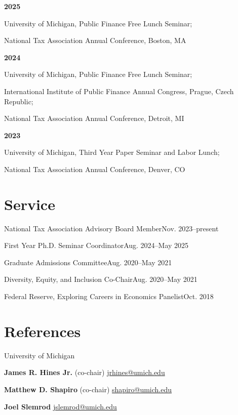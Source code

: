 \documentclass[11pt,letterpaper]{article}
\newcommand{\gap}{\vspace{6pt}}
\begin{document}
\textbf{2025}\par
University of Michigan, Public Finance Free Lunch Seminar;\par
National Tax Association Annual Conference, Boston, MA
\gap

\textbf{2024}\par
University of Michigan, Public Finance Free Lunch Seminar;\par
International Institute of Public Finance Annual Congress, Prague, Czech Republic;\par
National Tax Association Annual Conference, Detroit, MI
\gap

\textbf{2023}\par
University of Michigan, Third Year Paper Seminar and Labor Lunch;\par
National Tax Association Annual Conference, Denver, CO

\section{Service}
National Tax Association Advisory Board Member\hfill Nov. 2023--present\par\vspace{6pt}
First Year Ph.D. Seminar Coordinator\hfill Aug. 2024--May 2025\par\vspace{6pt}
Graduate Admissions Committee\hfill Aug. 2020--May 2021\par\vspace{6pt}
Diversity, Equity, and Inclusion Co-Chair\hfill Aug. 2020--May 2021\par\vspace{6pt}
Federal Reserve, Exploring Careers in Economics Panelist\hfill Oct. 2018

\section{References}
University of Michigan\par\vspace{5pt}
\textbf{James R. Hines Jr.} (co-chair)\hfill
\href{mailto:jrhines@umich.edu}{jrhines@umich.edu}\par\vspace{4pt}
\textbf{Matthew D. Shapiro} (co-chair)\hfill
\href{mailto:shapiro@umich.edu}{shapiro@umich.edu}\par\vspace{4pt}
\textbf{Joel Slemrod}\hfill
\href{mailto:jslemrod@umich.edu}{jslemrod@umich.edu}
\end{document}

